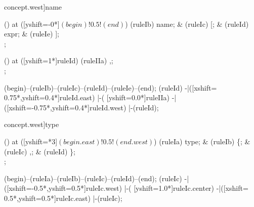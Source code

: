 \begin{syntax}[[xshift=22mm]concept.west]{name}
  
  \node[sequence,column sep=1.5cm] () at ([yshift=-0*\syntaxruledist]$(begin)!0.5!(end)$) {
    \node[nonterminal]    (ruleIb) {name};
    &
    \node[terminal]       (ruleIc) {[};
    &
    \node[nonterminal]    (ruleId) {expr};
    &
    \node[terminal]       (ruleIe) {]};
    \\
  };
  
  \node[sequence,column sep=1.0cm] () at ([yshift=1*\syntaxruledist]ruleId) {
    \node[terminal]    (ruleIIa) {,};
    \\
  };
  
  \draw[path] (begin)--(ruleIb)--(ruleIc)--(ruleId)--(ruleIe)--(end);
  \draw[path] (ruleId)
            -|([xshift= 0.75*\syntaxruledist,yshift=0.4*\syntaxruledist]ruleId.east)
            |-(                            [yshift=0.0*\syntaxruledist]ruleIIa)
            -|([xshift=-0.75*\syntaxruledist,yshift=0.4*\syntaxruledist]ruleId.west)
            |-(ruleId);
\end{syntax}

\begin{syntax}[[xshift=22mm]concept.west]{type}
  
  \node[sequence,anchor=north,column sep=1.5cm] () at ([yshift=\syntaxrulenodeheight-0.8pt*3]$(begin.east)!0.5!(end.west)$) {
    \node[nonterminal] (ruleIa) {type};
    &
    \node[terminal]    (ruleIb) {\{};
    &
    \node[terminal]    (ruleIc) {,};
    &
    \node[terminal]    (ruleId) {\}};
    \\
  };
  
  \draw[path] (begin)--(ruleIa)--(ruleIb)--(ruleIc)--(ruleId)--(end);
  \draw[path] (ruleIc)
            -|([xshift=-0.5*\syntaxruledist,yshift=0.5*\syntaxruledist]ruleIc.west)
            |-(                            [yshift=1.0*\syntaxruledist]ruleIc.center)
            -|([xshift= 0.5*\syntaxruledist,yshift=0.5*\syntaxruledist]ruleIc.east)
            |-(ruleIc);
\end{syntax}

